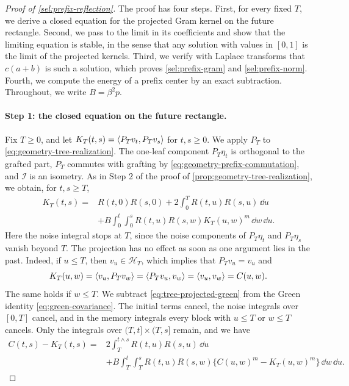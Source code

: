 \begin{proof}[Proof of \cref{sel:prefix-reflection}]
The proof has four steps. First, for every fixed $T$, we derive a closed equation for the projected Gram kernel on the future rectangle. Second, we pass to the limit in its coefficients and show that the limiting equation is stable, in the sense that any solution with values in $[0,1]$ is the limit of the projected kernels. Third, we verify with Laplace transforms that $c(a+b)$ is such a solution, which proves \eqref{sel:prefix-gram} and \eqref{sel:prefix-norm}. Fourth, we compute the energy of a prefix center by an exact subtraction. Throughout, we write $B=\beta^2p$.

\paragraph{Step 1: the closed equation on the future rectangle.}
Fix $T\ge0$, and let $K_T(t,s)=\left\langle P_Tv_t,P_Tv_s\right\rangle$ for $t,s\ge0$. We apply $P_T$ to \eqref{eq:geometry-tree-realization}. The one-leaf component $P_T\eta_t$ is orthogonal to the grafted part, $P_T$ commutes with grafting by \eqref{eq:geometry-prefix-commutation}, and $\mathcal I$ is an isometry. As in Step 2 of the proof of \cref{prop:geometry-tree-realization}, we obtain, for $t,s\ge T$,
\begin{equation}\label{eq:tree-projected-green}
\begin{split}
 K_T(t,s)={}&R(t,0)R(s,0)+2\int_0^TR(t,u)R(s,u)\,\dd u\\
 &+B\int_0^t\int_0^sR(t,u)R(s,w)K_T(u,w)^m\,\dd w\,\dd u.
\end{split}
\end{equation}
Here the noise integral stops at $T$, since the noise components of $P_T\eta_t$ and $P_T\eta_s$ vanish beyond $T$. The projection has no effect as soon as one argument lies in the past. Indeed, if $u\le T$, then $v_u\in\mathcal H_T$, which implies that $P_Tv_u=v_u$ and
\[
 K_T(u,w)=\left\langle v_u,P_Tv_w\right\rangle=\left\langle P_Tv_u,v_w\right\rangle=\left\langle v_u,v_w\right\rangle=C(u,w).
\]
The same holds if $w\le T$. We subtract \eqref{eq:tree-projected-green} from the Green identity \eqref{eq:green-covariance}. The initial terms cancel, the noise integrals over $[0,T]$ cancel, and in the memory integrals every block with $u\le T$ or $w\le T$ cancels. Only the integrals over $(T,t]\times(T,s]$ remain, and we have
\[
\begin{aligned}
 C(t,s)-K_T(t,s)={}&2\int_T^{t\wedge s}R(t,u)R(s,u)\,\dd u\\
 &+B\int_T^t\int_T^sR(t,u)R(s,w)\bigl\{C(u,w)^m-K_T(u,w)^m\bigr\}\,\dd w\,\dd u.

\end{aligned}\]
\end{proof}
